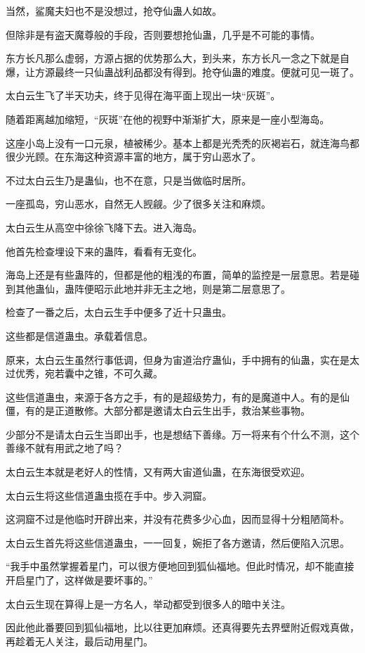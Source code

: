 \begin{this_body}
当然，鲨魔夫妇也不是没想过，抢夺仙蛊人如故。

但除非是有盗天魔尊般的手段，否则要想抢仙蛊，几乎是不可能的事情。

东方长凡那么虚弱，方源占据的优势那么大，到头来，东方长凡一念之下就是自爆，让方源最终一只仙蛊战利品都没有得到。抢夺仙蛊的难度。便就可见一斑了。

太白云生飞了半天功夫，终于见得在海平面上现出一块“灰斑”。

随着距离越加缩短，“灰斑”在他的视野中渐渐扩大，原来是一座小型海岛。

这座小岛上没有一口元泉，植被稀少。基本上都是光秃秃的灰褐岩石，就连海鸟都很少光顾。在东海这种资源丰富的地方，属于穷山恶水了。

不过太白云生乃是蛊仙，也不在意，只是当做临时居所。

一座孤岛，穷山恶水，自然无人觊觎。少了很多关注和麻烦。

太白云生从高空中徐徐飞降下去。进入海岛。

他首先检查埋设下来的蛊阵，看看有无变化。

海岛上还是有些蛊阵的，但都是他的粗浅的布置，简单的监控是一层意思。若是碰到其他蛊仙，蛊阵便昭示此地并非无主之地，则是第二层意思了。

检查了一番之后，太白云生手中便多了近十只蛊虫。

这些都是信道蛊虫。承载着信息。

原来，太白云生虽然行事低调，但身为宙道治疗蛊仙，手中拥有的仙蛊，实在是太过优秀，宛若囊中之锥，不可久藏。

这些信道蛊虫，来源于各方之手，有的是超级势力，有的是魔道中人。有的是仙僵，有的是正道散修。大部分都是邀请太白云生出手，救治某些事物。

少部分不是请太白云生当即出手，也是想结下善缘。万一将来有个什么不测，这个善缘不就有用武之地了吗？

太白云生本就是老好人的性情，又有两大宙道仙蛊，在东海很受欢迎。

太白云生将这些信道蛊虫揽在手中。步入洞窟。

这洞窟不过是他临时开辟出来，并没有花费多少心血，因而显得十分粗陋简朴。

太白云生首先将这些信道蛊虫，一一回复，婉拒了各方邀请，然后便陷入沉思。

“我手中虽然掌握着星门，可以很方便地回到狐仙福地。但此时情况，却不能直接开启星门了，这样做是要坏事的。”

太白云生现在算得上是一方名人，举动都受到很多人的暗中关注。

因此他此番要回到狐仙福地，比以往更加麻烦。还真得要先去界壁附近假戏真做，再趁着无人关注，最后动用星门。


\end{this_body}
